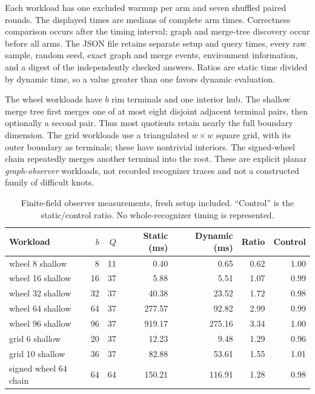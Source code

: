 \documentclass[11pt,letterpaper]{article}
\theoremstyle{definition}\newtheorem{definition}[theorem]{Definition}
\theoremstyle{remark}\newtheorem{remark}[theorem]{Remark}
\begin{document}
Each workload has one excluded warmup per arm and seven shuffled paired rounds. The displayed times are medians of complete arm times. Correctness comparison occurs after the timing interval; graph and merge-tree discovery occur before all arms. The JSON file retains separate setup and query times, every raw sample, random seed, exact graph and merge events, environment information, and a digest of the independently checked answers. Ratios are static time divided by dynamic time, so a value greater than one favors dynamic evaluation.

The wheel workloads have $b$ rim terminals and one interior hub. The shallow merge tree first merges one of at most eight disjoint adjacent terminal pairs, then optionally a second pair. Thus most quotients retain nearly the full boundary dimension. The grid workloads use a triangulated $w\times w$ square grid, with its outer boundary as terminals; these have nontrivial interiors. The signed-wheel chain repeatedly merges another terminal into the root. These are explicit planar \emph{graph-observer} workloads, not recorded recognizer traces and not a constructed family of difficult knots.


\begin{table}[htbp]
\centering
\small
\setlength{\tabcolsep}{4pt}
\begin{tabular}{lrrrrrr}
\toprule
Workload & $b$ & $Q$ & Static (ms) & Dynamic (ms) & Ratio & Control\\
\midrule
wheel 8 shallow & 8 & 11 & 0.40 & 0.65 & 0.62 & 1.00\\
wheel 16 shallow & 16 & 37 & 5.88 & 5.51 & 1.07 & 0.99\\
wheel 32 shallow & 32 & 37 & 40.38 & 23.52 & 1.72 & 0.98\\
wheel 64 shallow & 64 & 37 & 277.57 & 92.82 & 2.99 & 0.99\\
wheel 96 shallow & 96 & 37 & 919.17 & 275.16 & 3.34 & 1.00\\
grid 6 shallow & 20 & 37 & 12.23 & 9.48 & 1.29 & 0.96\\
grid 10 shallow & 36 & 37 & 82.88 & 53.61 & 1.55 & 1.01\\
signed wheel 64 chain & 64 & 64 & 150.21 & 116.91 & 1.28 & 0.98\\
\bottomrule
\end{tabular}
\caption{Finite-field observer measurements, fresh setup included. ``Control'' is the static/control ratio. No whole-recognizer timing is represented.}
\label{tab:bench}
\end{table}
\end{document}
